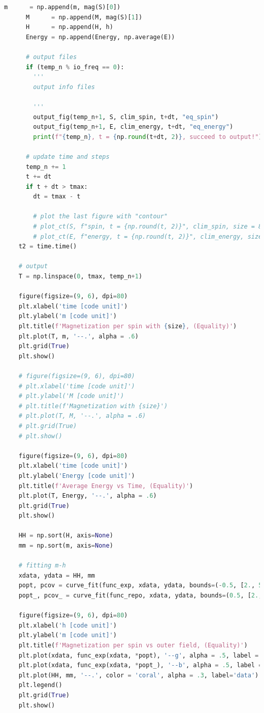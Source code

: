 \documentclass[10pt]{article}
\begin{document}
\begin{lstlisting}[language={Python}]
      m      = np.append(m, mag(S)[0])
      M      = np.append(M, mag(S)[1])
      H      = np.append(H, h)
      Energy = np.append(Energy, np.average(E))

      # output files
      if (temp_n % io_freq == 0):
        '''
        output info files

        '''
        output_fig(temp_n+1, S, clim_spin, t+dt, "eq_spin")
        output_fig(temp_n+1, E, clim_energy, t+dt, "eq_energy")
        print(f"{temp_n}, t = {np.round(t+dt, 2)}, succeed to output!")

      # update time and steps
      temp_n += 1
      t += dt
      if t + dt > tmax:
        dt = tmax - t

        # plot the last figure with "contour"
        # plot_ct(S, f"spin, t = {np.round(t, 2)}", clim_spin, size = 8, dpi = 80)
        # plot_ct(E, f"energy, t = {np.round(t, 2)}", clim_energy, size = 8, dpi = 80)
    t2 = time.time()
    
    # output
    T = np.linspace(0, tmax, temp_n+1)
    
    figure(figsize=(9, 6), dpi=80)
    plt.xlabel('time [code unit]')
    plt.ylabel('m [code unit]')
    plt.title(f'Magnetization per spin with {size}, (Equality)')
    plt.plot(T, m, '--.', alpha = .6)
    plt.grid(True)
    plt.show()
    
    # figure(figsize=(9, 6), dpi=80)
    # plt.xlabel('time [code unit]')
    # plt.ylabel('M [code unit]')
    # plt.title(f'Magnetization with {size}')
    # plt.plot(T, M, '--.', alpha = .6)
    # plt.grid(True)
    # plt.show()
    
    figure(figsize=(9, 6), dpi=80)
    plt.xlabel('time [code unit]')
    plt.ylabel('Energy [code unit]')
    plt.title(f'Average Energy vs Time, (Equality)')
    plt.plot(T, Energy, '--.', alpha = .6)
    plt.grid(True)
    plt.show()
    
    HH = np.sort(H, axis=None)
    mm = np.sort(m, axis=None)

    # fitting m-h
    xdata, ydata = HH, mm
    popt, pcov = curve_fit(func_exp, xdata, ydata, bounds=(-0.5, [2., 50., 2., 1.]))
    popt_, pcov_ = curve_fit(func_repo, xdata, ydata, bounds=(0.5, [2., 10., 1., 1.]), p0=([2,5,1,0.6])) 

    figure(figsize=(9, 6), dpi=80)
    plt.xlabel('h [code unit]')
    plt.ylabel('m [code unit]')
    plt.title(f'Magnetization per spin vs outer field, (Equality)')
    plt.plot(xdata, func_exp(xdata, *popt), '--g', alpha = .5, label = f'exp fit with \n popt = {np.round(popt, 2)}')
    plt.plot(xdata, func_exp(xdata, *popt_), '--b', alpha = .5, label = f'reciprocal fit with \n popt = {np.round(popt_,2)}')
    plt.plot(HH, mm, '--.', color = 'coral', alpha = .3, label='data')
    plt.legend()
    plt.grid(True)
    plt.show()


\end{lstlisting}
\end{document}

